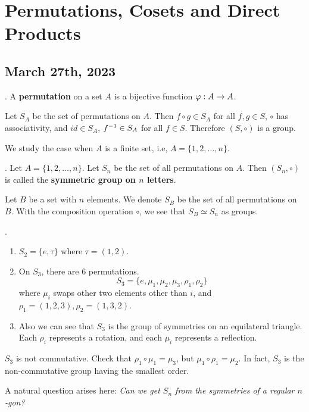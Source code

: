 \chapter{Permutations, Cosets and Direct Products}

\section*{March 27th, 2023}

\setcounter{topic}{7}

.  A \textbf{permutation} on a set \(A\) is a bijective function \(\varphi: A \rightarrow A\).

\rmk Let \(S_A\) be the set of permutations on \(A\). Then \(f \circ g \in S_A\) for all \(f, g \in S\), \(\circ\) has associativity, and \(id \in S_A\), \(f^{-1} \in S_A\) for all \(f \in S\). Therefore \((S, \circ)\) is a group.

We study the case when \(A\) is a finite set, i.e, \(A = \{1, 2, \dots, n\}\).

.  Let \(A = \{1, 2, \dots, n\}\). Let \(S_n\) be the set of all permutations on \(A\). Then \((S_n, \circ)\) is called the \textbf{symmetric group on \(n\) letters}.

Let \(B\) be a set with \(n\) elements. We denote \(S_B\) be the set of all permutations on \(B\). With the composition operation \(\circ\), we see that \(S_B \simeq S_n\) as groups.

\ex.
\begin{enumerate}
    \item \(S_2 = \{e, \tau\}\) where \(\tau = (1, 2)\).
    \item On \(S_3\), there are 6 permutations.
          \[
              S_3 = \{e, \mu_1, \mu_2, \mu_3, \rho_1, \rho_2\}
          \]
          where \(\mu_i\) swaps other two elements other than \(i\), and \(\rho_1 = (1, 2, 3), \rho_2 = (1, 3, 2)\).
    \item Also we can see that \(S_3\) is the group of symmetries on an equilateral triangle. Each \(\rho_i\) represents a rotation, and each \(\mu_i\) represents a reflection.
\end{enumerate}

\rmk \(S_3\) is not commutative. Check that \(\rho_1 \circ \mu_1 = \mu_3\), but \(\mu_1 \circ \rho_1 = \mu_2\). In fact, \(S_3\) is the non-commutative group having the smallest order.

A natural question arises here: \textit{Can we get \(S_n\) from the symmetries of a regular \(n\)-gon?}

